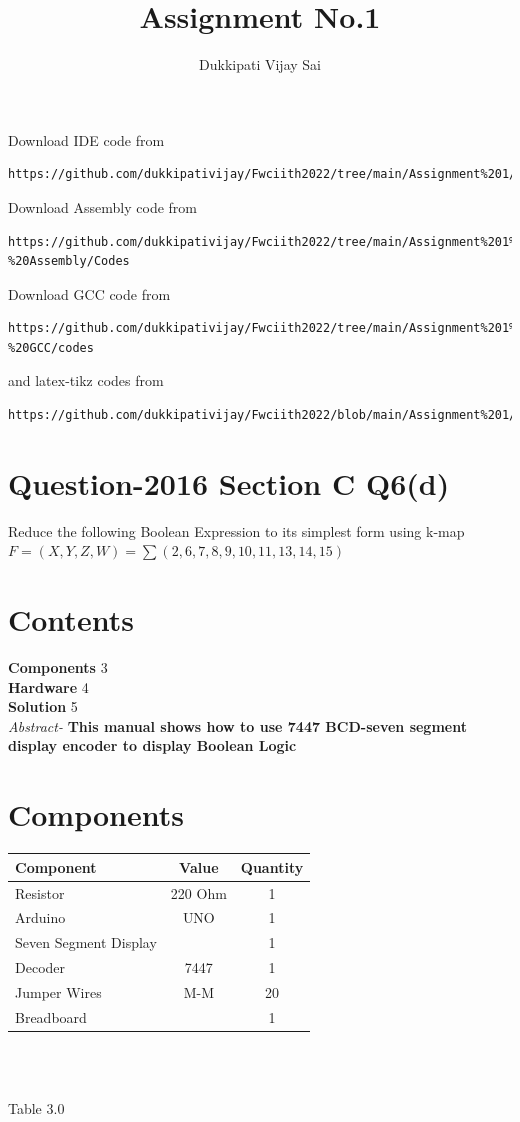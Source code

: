 \documentclass[journal,12pt,twocolumn]{IEEEtran}
\begin{document}
\title{Assignment No.1}

\author{Dukkipati Vijay Sai}
\maketitle
\newpage
\bigskip
\renewcommand{\thefigure}{\theenumi}
\renewcommand{\thetable}{\theenumi}


Download IDE code from 
\begin{lstlisting}
https://github.com/dukkipativijay/Fwciith2022/tree/main/Assignment%201/Codes/src
\end{lstlisting}
Download Assembly code from
\begin{lstlisting}
https://github.com/dukkipativijay/Fwciith2022/tree/main/Assignment%201%20-%20Assembly/Codes
\end{lstlisting}
Download GCC code from
\begin{lstlisting}
https://github.com/dukkipativijay/Fwciith2022/tree/main/Assignment%201%20-%20GCC/codes
\end{lstlisting}
%
and latex-tikz codes from 
%
\begin{lstlisting}
https://github.com/dukkipativijay/Fwciith2022/blob/main/Assignment%201/Latex%20File.tex
\end{lstlisting}
%
\section{Question-2016 Section C Q6(d)}

Reduce the following Boolean Expression to its simplest form using k-map
$F=(X,Y,Z,W)= \sum(2,6,7,8,9,10,11,13,14,15)$
\section{Contents}
\raggedright
\textbf{Components}
\hspace{10em} 3
\\\textbf{Hardware}
\hspace{11em} 4
\\\textbf{Solution}
\hspace{11.8em}   5\\
\textit{Abstract-}
\textbf{This manual shows how to use 7447 BCD-seven segment display encoder to display Boolean Logic}
\section{Components}
\centering
\begin{tabular}{|l|c|c|}
\hline
Component & Value & Quantity\\
\hline
Resistor & 220 Ohm & 1\\
\hline
Arduino & UNO & 1\\
\hline
Seven Segment Display & & 1\\
\hline
Decoder & 7447 & 1\\
\hline
Jumper Wires & M-M & 20\\
\hline
Breadboard & & 1\\
\hline
\end{tabular}\\
\
\centerline{Table 3.0}
\end{document}
